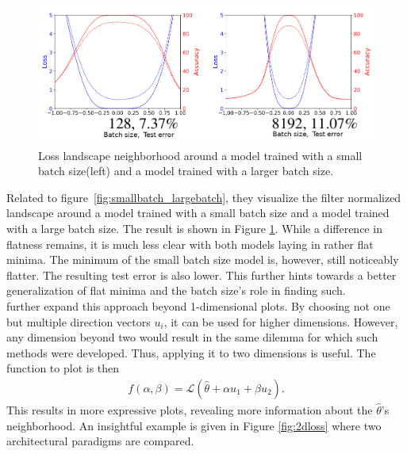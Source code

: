 \documentclass[a4paper]{scrartcl}
\begin{document}
\begin{figure}[H]
	\centering
	\includegraphics[width=.7\linewidth]{figures/batch_size_normalized.png}
	\caption{Loss landscape neighborhood around a model trained with a small batch size(left) and a model trained with a larger batch size.}
	\label{fig:smallbatch_largebatch_normalized}
\end{figure}
Related to figure~\ref{fig:smallbatch_largebatch}, they visualize the filter normalized landscape around a model trained with a small batch size and a model trained with a large batch size. The result is shown in Figure \ref{fig:smallbatch_largebatch_normalized}. While a difference in flatness remains, it is much less clear with both models laying in rather flat minima. The minimum of the small batch size model is, however, still noticeably flatter. The resulting test error is also lower. This further hints towards a better generalization of flat minima and the batch size's role in finding such.\\
\cite{li2017visualizing} further expand this approach beyond 1-dimensional plots. By choosing not one but multiple direction vectors $u_i$, it can be used for higher dimensions. However, any dimension beyond two would result in the same dilemma for which such methods were developed. Thus, applying it to two dimensions is useful. The function to plot is then
\begin{align*}
		f(\alpha, \beta) = \mathcal{L}(\hat{\theta} + \alpha u_1 + \beta u_2).
\end{align*}
This results in more expressive plots, revealing more information about the $\hat{\theta}$'s neighborhood. An insightful example is given in Figure \ref{fig:2dloss} where two architectural paradigms are compared. 
\end{document}
